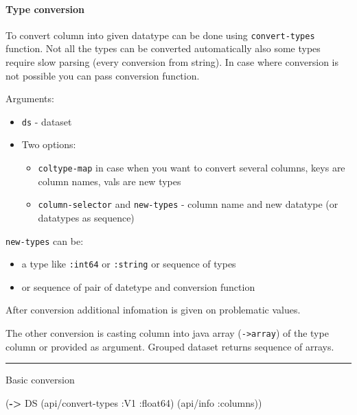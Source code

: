 \documentclass[]{article}
\newenvironment{Shaded}{\begin{snugshade}}{\end{snugshade}}
\newcommand{\AttributeTok}[1]{\textcolor[rgb]{0.77,0.63,0.00}{#1}}
\newcommand{\KeywordTok}[1]{\textcolor[rgb]{0.13,0.29,0.53}{\textbf{#1}}}
\newcommand{\NormalTok}[1]{#1}
\providecommand{\tightlist}{%
  \setlength{\itemsep}{0pt}\setlength{\parskip}{0pt}}
\let\oldparagraph\paragraph
\renewcommand{\paragraph}[1]{\oldparagraph{#1}\mbox{}}
\begin{document}
\hypertarget{type-conversion}{%
\paragraph{Type conversion}\label{type-conversion}}

To convert column into given datatype can be done using
\texttt{convert-types} function. Not all the types can be converted
automatically also some types require slow parsing (every conversion
from string). In case where conversion is not possible you can pass
conversion function.

Arguments:

\begin{itemize}
\tightlist
\item
  \texttt{ds} - dataset
\item
  Two options:

  \begin{itemize}
  \tightlist
  \item
    \texttt{coltype-map} in case when you want to convert several
    columns, keys are column names, vals are new types
  \item
    \texttt{column-selector} and \texttt{new-types} - column name and
    new datatype (or datatypes as sequence)
  \end{itemize}
\end{itemize}

\texttt{new-types} can be:

\begin{itemize}
\tightlist
\item
  a type like \texttt{:int64} or \texttt{:string} or sequence of types
\item
  or sequence of pair of datetype and conversion function
\end{itemize}

After conversion additional infomation is given on problematic values.

The other conversion is casting column into java array
(\texttt{-\textgreater{}array}) of the type column or provided as
argument. Grouped dataset returns sequence of arrays.

\begin{center}\rule{0.5\linewidth}{0.5pt}\end{center}

Basic conversion

\begin{Shaded}
\begin{Highlighting}[]
\NormalTok{(}\KeywordTok{->}\NormalTok{ DS}
\NormalTok{    (api/convert-types }\AttributeTok{:V1} \AttributeTok{:float64}\NormalTok{)}
\NormalTok{    (api/info }\AttributeTok{:columns}\NormalTok{))}
\end{Highlighting}
\end{Shaded}
\end{document}

